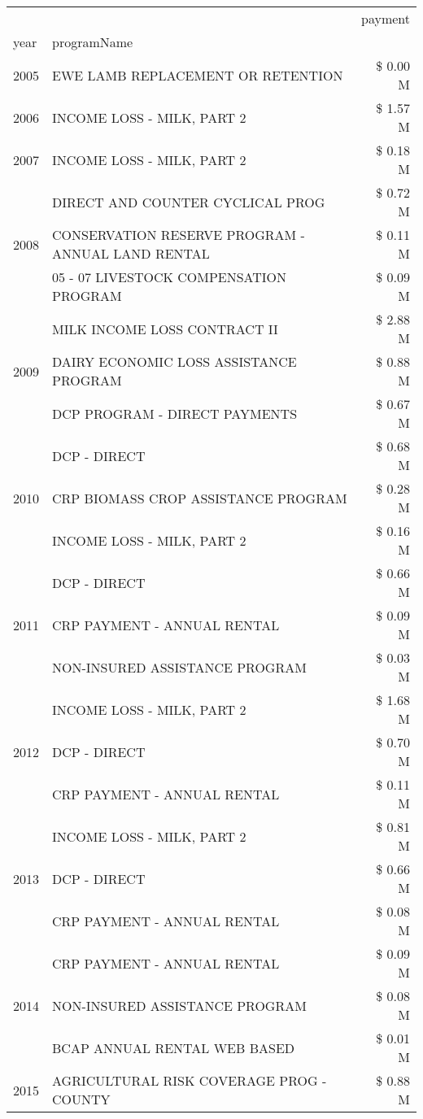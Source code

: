\begin{tabular}{llr}
\toprule
 &  & payment \\
year & programName &  \\
\midrule
2005 & EWE LAMB REPLACEMENT OR RETENTION & \$ 0.00 M \\
\cline{1-3}
2006 & INCOME LOSS - MILK, PART 2 & \$ 1.57 M \\
\cline{1-3}
2007 & INCOME LOSS - MILK, PART 2 & \$ 0.18 M \\
\cline{1-3}
\multirow[t]{3}{*}{2008} & DIRECT AND COUNTER CYCLICAL PROG & \$ 0.72 M \\
 & CONSERVATION RESERVE PROGRAM - ANNUAL LAND RENTAL & \$ 0.11 M \\
 & 05 - 07 LIVESTOCK COMPENSATION PROGRAM & \$ 0.09 M \\
\cline{1-3}
\multirow[t]{3}{*}{2009} & MILK INCOME LOSS CONTRACT II & \$ 2.88 M \\
 & DAIRY ECONOMIC LOSS ASSISTANCE PROGRAM & \$ 0.88 M \\
 & DCP PROGRAM - DIRECT PAYMENTS & \$ 0.67 M \\
\cline{1-3}
\multirow[t]{3}{*}{2010} & DCP - DIRECT & \$ 0.68 M \\
 & CRP BIOMASS CROP ASSISTANCE PROGRAM & \$ 0.28 M \\
 & INCOME LOSS - MILK, PART 2 & \$ 0.16 M \\
\cline{1-3}
\multirow[t]{3}{*}{2011} & DCP - DIRECT & \$ 0.66 M \\
 & CRP PAYMENT - ANNUAL RENTAL & \$ 0.09 M \\
 & NON-INSURED ASSISTANCE PROGRAM & \$ 0.03 M \\
\cline{1-3}
\multirow[t]{3}{*}{2012} & INCOME LOSS - MILK, PART 2 & \$ 1.68 M \\
 & DCP - DIRECT & \$ 0.70 M \\
 & CRP PAYMENT - ANNUAL RENTAL & \$ 0.11 M \\
\cline{1-3}
\multirow[t]{3}{*}{2013} & INCOME LOSS - MILK, PART 2 & \$ 0.81 M \\
 & DCP - DIRECT & \$ 0.66 M \\
 & CRP PAYMENT - ANNUAL RENTAL & \$ 0.08 M \\
\cline{1-3}
\multirow[t]{3}{*}{2014} & CRP PAYMENT - ANNUAL RENTAL & \$ 0.09 M \\
 & NON-INSURED ASSISTANCE PROGRAM & \$ 0.08 M \\
 & BCAP ANNUAL RENTAL WEB BASED & \$ 0.01 M \\
\cline{1-3}
\multirow[t]{3}{*}{2015} & AGRICULTURAL RISK COVERAGE PROG - COUNTY & \$ 0.88 M \\

\end{tabular}
